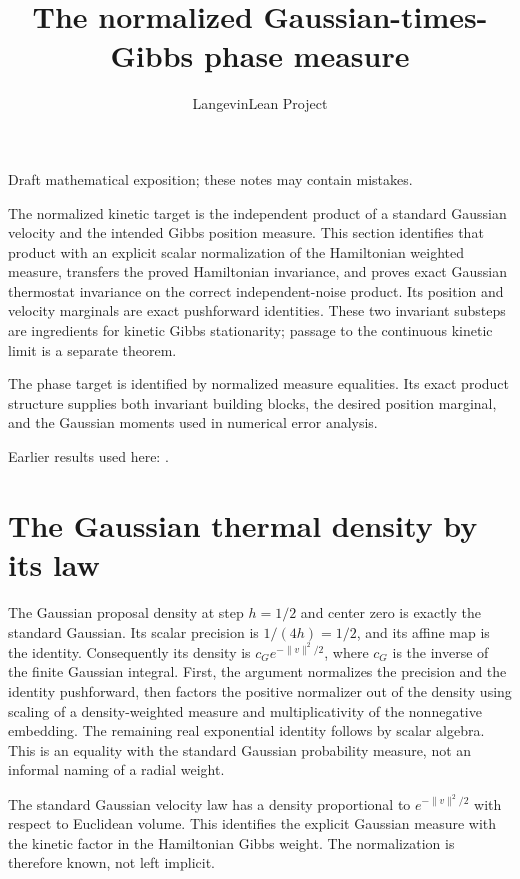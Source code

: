 \documentclass[11pt,a4paper]{article}
\title{\texorpdfstring{The normalized Gaussian-times-Gibbs phase measure}{The normalized Gaussian-times-Gibbs phase measure}}
\author{LangevinLean Project}
\date{}
\begin{document}
\maketitle
Draft mathematical exposition; these notes may contain mistakes.


The normalized kinetic target is the independent product of a standard Gaussian velocity and the intended Gibbs position measure. This section identifies that product with an explicit scalar normalization of the Hamiltonian weighted measure, transfers the proved Hamiltonian invariance, and proves exact Gaussian thermostat invariance on the correct independent-noise product. Its position and velocity marginals are exact pushforward identities. These two invariant substeps are ingredients for kinetic Gibbs stationarity; passage to the continuous kinetic limit is a separate theorem.



The phase target is identified by normalized measure equalities. Its exact product structure supplies both invariant building blocks, the desired position marginal, and the Gaussian moments used in numerical error analysis.



Earlier results used here: \cite[Section~3.37]{LangevinLean2026ULASC}.

\section{\texorpdfstring{The Gaussian thermal density by its law}{The Gaussian thermal density by its law}}


The Gaussian proposal density at step \(h=1/2\) and center zero is exactly the standard Gaussian. Its scalar precision is \(1/(4h)=1/2\), and its affine map is the identity. Consequently its density is \(c_Ge^{-\|v\|^2/2}\), where \(c_G\) is the inverse of the finite Gaussian integral. First, the argument normalizes the precision and the identity pushforward, then factors the positive normalizer out of the density using scaling of a density-weighted measure and multiplicativity of the nonnegative embedding. The remaining real exponential identity follows by scalar algebra. This is an equality with the standard Gaussian probability measure, not an informal naming of a radial weight.



The standard Gaussian velocity law has a density proportional to \(e^{-\|v\|^2/2}\) with respect to Euclidean volume. This identifies the explicit Gaussian measure with the kinetic factor in the Hamiltonian Gibbs weight. The normalization is therefore known, not left implicit.
\end{document}

